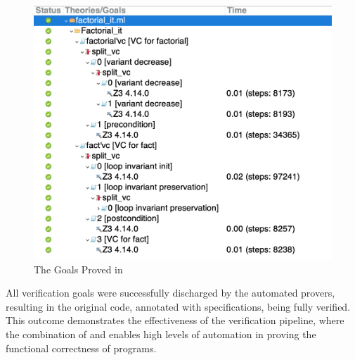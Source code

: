 \begin{figure}[H]
    \centering
    \includegraphics[width=0.6\linewidth]{images/Why3Goals.png}
    \caption{The Goals Proved in \whythree}
    \label{fig:Why3Goals}
\end{figure}

All verification goals were successfully discharged by the automated provers, resulting in the original \ocaml code, annotated 
with \gospel specifications, being fully verified. This outcome demonstrates the effectiveness of the verification pipeline, 
where the combination of \cameleer and \whythree enables high levels of automation in proving the functional correctness of 
\ocaml programs.